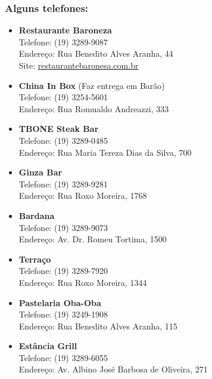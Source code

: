 \subsubsection{Alguns telefones:}

\begin{itemize}
\item   \textbf{Restaurante Baroneza}
        \\Telefone: (19) 3289-9087
        \\Endereço: Rua Benedito Alves Aranha, 44
        \\Site: \url{restaurantebaronesa.com.br}

\item   \textbf{China In Box} (Faz entrega em Barão)
        \\Telefone: (19) 3254-5601
        \\Endereço: Rua Romualdo Andreazzi, 333

\item   \textbf{TBONE Steak Bar}
        \\Telefone: (19) 3289-0485
        \\Endereço: Rua Maria Tereza Dias da Silva, 700

\item   \textbf{Ginza Bar}
        \\Telefone: (19) 3289-9281
        \\Endereço: Rua Roxo Moreira, 1768

\item   \textbf{Bardana}
        \\Telefone: (19) 3289-9073
        \\Endereço: Av. Dr. Romeu Tortima, 1500

\item   \textbf{Terraço}
        \\Telefone: (19) 3289-7920
        \\Endereço: Rua Roxo Moreira, 1344

\item   \textbf{Pastelaria Oba-Oba}
        \\Telefone: (19) 3249-1908
        \\Endereço: Rua Benedito Alves Aranha, 115

\item   \textbf{Estância Grill}
        \\Telefone: (19) 3289-6055
        \\Endereço: Av. Albino José Barbosa de Oliveira, 271


\end{itemize}
